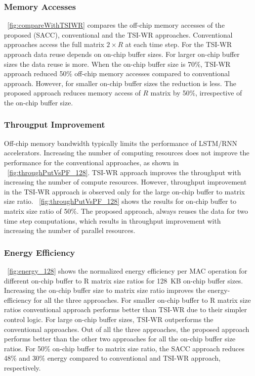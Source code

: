 \documentclass[a4paper,10pt]{article}
\begin{document}
\subsubsection{Memory Accesses}
\figurename{~\ref{fig:compareWithTSIWR}} compares the off-chip memory accesses of the proposed (SACC), conventional and the TSI-WR approaches. Conventional approaches access the full matrix $2{\times}R$ at each time step. For the TSI-WR approach data reuse depends on on-chip buffer sizes. For larger on-chip buffer sizes the data reuse is more. When the on-chip buffer size is 70\%, TSI-WR approach reduced 50\% off-chip memory accesses compared to conventional approach. However, for smaller on-chip buffer sizes the reduction is less. The proposed approach reduces memory access of $R$ matrix by 50\%, irrespective of the on-chip buffer size.
\subsubsection{Througput Improvement}
Off-chip memory bandwidth typically limits the performance of LSTM/RNN accelerators. Increasing the number of computing resources does not improve the performance for the conventional approaches, as shown in \figurename{~\ref{fig:throughPutVsPF_128}}. TSI-WR approach improves the throughput with increasing the number of compute resources. However, throughput improvement in the TSI-WR approach is observed only for the large on-chip buffer to matrix size ratio. \figurename{~\ref{fig:throughPutVsPF_128}} shows the results for on-chip buffer to matrix size ratio of 50\%. The proposed approach, always reuses the data for two time step computations, which results in throughput improvement with increasing the number of parallel resources.
\subsubsection{Energy Efficiency}
\figurename{~\ref{fig:energy_128}} shows the normalized energy efficiency per MAC operation for different on-chip buffer to R matrix size ratios for 128~KB on-chip buffer sizes. Increasing the on-chip buffer size to matrix size ratio improves the energy-efficiency for all the three approaches. For smaller on-chip buffer to R matrix size ratios conventional approach performs better than TSI-WR due to their simpler control logic. For large on-chip buffer sizes, TSI-WR outperforms the conventional approaches. Out of all the three approaches, the proposed approach performs better than the other two approaches for all the on-chip buffer size ratios. For 50\% on-chip buffer to matrix size ratio, the SACC approach reduces 48\% and 30\% energy compared to conventional and TSI-WR approach, respectively.
\end{document}
